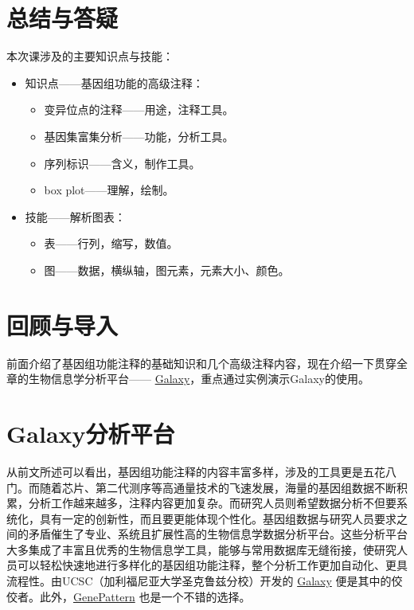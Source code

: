 \documentclass[11pt,a4paper,twoside]{book}
\begin{document}
\section{总结与答疑}
本次课涉及的主要知识点与技能：
\begin{itemize}
  \item 知识点——基因组功能的高级注释：
    \begin{itemize}
      \item 变异位点的注释——用途，注释工具。
      \item 基因集富集分析——功能，分析工具。
      \item 序列标识——含义，制作工具。
      \item box plot——理解，绘制。
    \end{itemize}
  \item 技能——解析图表：
    \begin{itemize}
      \item 表——行列，缩写，数值。
      \item 图——数据，横纵轴，图元素，元素大小、颜色。
    \end{itemize}
\end{itemize}

\section{回顾与导入}
前面介绍了基因组功能注释的基础知识和几个高级注释内容，现在介绍一下贯穿全章的生物信息学分析平台—— \href{http://galaxyproject.org}{Galaxy}，重点通过实例演示Galaxy的使用。

\section{Galaxy分析平台}
从前文所述可以看出，基因组功能注释的内容丰富多样，涉及的工具更是五花八门。而随着芯片、第二代测序等高通量技术的飞速发展，海量的基因组数据不断积累，分析工作越来越多，注释内容更加复杂。而研究人员则希望数据分析不但要系统化，具有一定的创新性，而且要更能体现个性化。基因组数据与研究人员要求之间的矛盾催生了专业、系统且扩展性高的生物信息学数据分析平台。这些分析平台大多集成了丰富且优秀的生物信息学工具，能够与常用数据库无缝衔接，使研究人员可以轻松快速地进行多样化的基因组功能注释，整个分析工作更加自动化、更具流程性。由UCSC（加利福尼亚大学圣克鲁兹分校）开发的 \href{https://main.g2.bx.psu.edu/}{Galaxy} 便是其中的佼佼者。此外，\href{http://www.broadinstitute.org/cancer/software/genepattern/}{GenePattern} 也是一个不错的选择。
\end{document}
